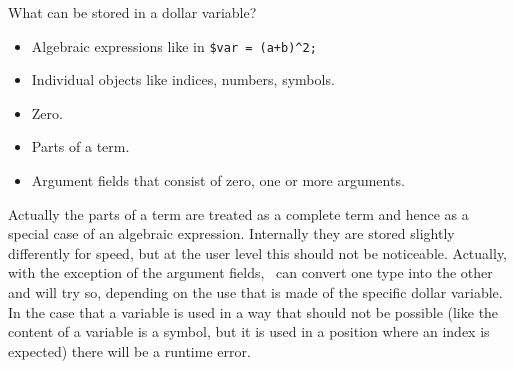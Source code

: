 What can be stored in a dollar variable?
\begin{itemize}
\item Algebraic expressions like in \verb:$var = (a+b)^2;:
\item Individual objects like indices, numbers, symbols.
\item Zero.
\item Parts of a term.
\item Argument fields that consist of zero, one or 
more arguments.
\end{itemize}
Actually the parts of a term are treated as a complete term and hence as a 
special case of an algebraic expression. Internally they are stored 
slightly differently for speed, but at the user level this should not be 
noticeable. Actually, with the exception of the argument fields, \FORM\ can 
convert one type into the other and will try so, depending on the use that 
is made of the specific dollar variable. In the case that a variable is 
used in a way that should not be possible (like the content of a variable 
is a symbol, but it is used in a position where an index is expected) there 
will be a runtime error.


